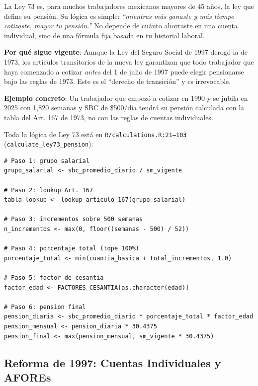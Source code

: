 \documentclass[11pt,a4paper]{report}
\begin{document}
\begin{tcolorbox}[colback=green!5!white, colframe=green!50!black, title=\textbf{Intuici\'on}]
La Ley 73 es, para muchos trabajadores mexicanos mayores de 45 a\~nos, la ley que define su pensi\'on. Su l\'ogica es simple: \emph{``mientras m\'as ganaste y m\'as tiempo cotizaste, mayor tu pensi\'on.''} No depende de cu\'anto ahorraste en una cuenta individual, sino de una f\'ormula fija basada en tu historial laboral.

\textbf{Por qu\'e sigue vigente}: Aunque la Ley del Seguro Social de 1997 derog\'o la de 1973, los art\'iculos transitorios de la nueva ley garantizan que todo trabajador que haya comenzado a cotizar \emph{antes} del 1 de julio de 1997 puede elegir pensionarse bajo las reglas de 1973. Este es el ``derecho de transici\'on'' y es irrevocable.

\textbf{Ejemplo concreto}: Un trabajador que empez\'o a cotizar en 1990 y se jubila en 2025 con 1,820 semanas y SBC de \$500/d\'ia tendr\'a su pensi\'on calculada con la tabla del Art. 167 de 1973, no con las reglas de cuentas individuales.
\end{tcolorbox}

\begin{tcolorbox}[colback=orange!5!white, colframe=orange!75!black, title=\textbf{Aplicaci\'on en C\'odigo}]
Toda la l\'ogica de Ley 73 est\'a en \texttt{R/calculations.R:21--103} (\texttt{calculate\_ley73\_pension}):

\begin{lstlisting}
# Paso 1: grupo salarial
grupo_salarial <- sbc_promedio_diario / sm_vigente

# Paso 2: lookup Art. 167
tabla_lookup <- lookup_articulo_167(grupo_salarial)

# Paso 3: incrementos sobre 500 semanas
n_incrementos <- max(0, floor((semanas - 500) / 52))

# Paso 4: porcentaje total (tope 100%)
porcentaje_total <- min(cuantia_basica + total_incrementos, 1.0)

# Paso 5: factor de cesantia
factor_edad <- FACTORES_CESANTIA[as.character(edad)]

# Paso 6: pension final
pension_diaria <- sbc_promedio_diario * porcentaje_total * factor_edad
pension_mensual <- pension_diaria * 30.4375
pension_final <- max(pension_mensual, sm_vigente * 30.4375)
\end{lstlisting}
\end{tcolorbox}

\subsection{Reforma de 1997: Cuentas Individuales y AFOREs}
\end{document}
